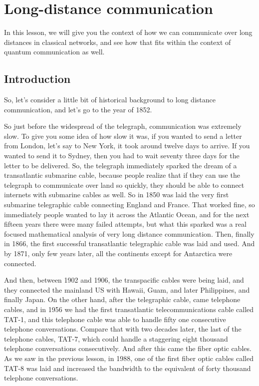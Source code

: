 \chapter{Long-distance communication}
\label{ch:long}

In this lesson, we will give you the context of how we can communicate over long distances in classical networks, and see how that fits within the context of quantum communication as well.

\section{Introduction}


So, let's consider a little bit of historical background to long distance communication, and let's go to the year of 1852.

So just before the widespread of the telegraph, communication was extremely slow. To give you some idea of how slow it was, if you wanted to send a letter from London, let's say to New York, it took around twelve days to arrive. If you wanted to send it to Sydney, then you had to wait seventy three days for the letter to be delivered. So, the telegraph immediately sparked the dream of a transatlantic submarine cable, because people realize that if they can use the telegraph to communicate over land so quickly, they should be able to connect internets with submarine cables as well. So in 1850 was laid the very first submarine telegraphic cable connecting England and France. That worked fine, so immediately people wanted to lay it across the Atlantic Ocean, and for the next fifteen years there were many failed attempts, but what this sparked was a real focused mathematical analysis of very long distance communication. Then, finally in 1866, the first successful transatlantic telegraphic cable was laid and used. And by 1871, only few years later, all the continents except for Antarctica were connected.

And then, between 1902 and 1906, the transpacific cables were being laid, and they connected the mainland US with Hawaii, Guam, and later Philippines, and finally Japan. On the other hand, after the telegraphic cable, came telephone cables, and in 1956 we had the first transatlantic telecommunications cable called TAT-1, and this telephone cable was able to handle fifty one consecutive telephone conversations. Compare that with two decades later, the last of the telephone cables, TAT-7, which could handle a staggering eight thousand telephone conversations consecutively. And after this came the fiber optic cables. As we saw in the previous lesson, in 1988, one of the first fiber optic cables called TAT-8 was laid and increased the bandwidth to the equivalent of forty thousand telephone conversations.


